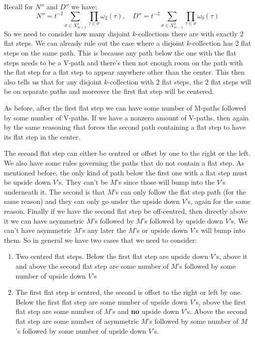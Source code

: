 \documentclass[11pt]{article}
\theoremstyle{definition}
\theoremstyle{definition}
\theoremstyle{plain}
\theoremstyle{plain}
\theoremstyle{plain}
\theoremstyle{definition}
\begin{document}
Recall for $N''$ and $D''$ we have:
\begin{equation*}
N'' = t^{-2}\sum\limits_{\sigma\in X_{m+1}^2}\prod\limits_{\tau\in\sigma}\omega_2(\tau),\quad D'' = t^{-2}\sum\limits_{\sigma\in X_{m-1}^2}\prod\limits_{\tau\in\sigma}\omega_0(\tau)
\end{equation*}
So we need to consider how many disjoint $k$-collections there are with exactly 2 flat steps. We can already rule out the case where a disjoint $k$-collection has 2 flat steps on the same path. This is because any path below the one with the flat steps needs to be a V-path and there's then not enough room on the path with the flat step for a flat step to appear anywhere other than the center. This then also tells us that for any disjoint $k$-collection with 2 flat steps, the 2 flat steps will be on separate paths and moreover the first flat step will be centered.

As before, after the first flat step we can have some number of M-paths followed by some number of V-paths. If we have a nonzero amount of V-paths, then again by the same reasoning that forces the second path containing a flat step to have its flat step in the center.

The second flat step can either be centred or offset by one to the right or the left. We also have some rules governing the paths that do not contain a flat step. As mentioned before, the only kind of path below the first one with a flat step must be upside down $V$'s. They can't be $M$'s since those will bump into the $V$'s underneath it. The second is that $M$'s can only follow the flat step path (for the same reason) and they can only go under the upside down $V$'s, again for the same reason. Finally if we have the second flat step be off-centred, then directly above it we can have asymmetric $M$'s followed by $M$'s followed by upside down $V$'s. We can't have asymmetric $M$'s any later the $M$'s or upside down $V$'s will bump into them. So in general we have two cases that we need to consider:

\begin{enumerate}[label=(\alph*)]
\item Two centred flat steps. Below the first flat step are upside down $V$'s, above it and above the second flat step are some number of $M$'s followed by some number of upside down $V$'s
\item The first flat step is centred, the second is offset to the right or left by one. Below the first flat step are some number of upside down $V$'s, above the first flat step are some number of $M$'s and \textbf{no} upside down $V$'s. Above the second flat step are some number of asymmetric $M$'s followed by some number of $M$'s followed by some number of upside down $V$'s.
\end{enumerate}
\end{document}
